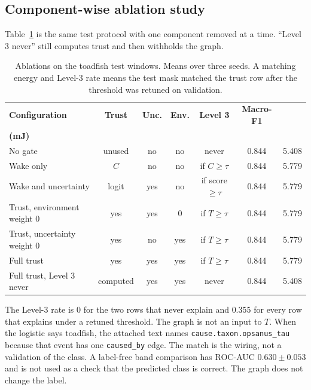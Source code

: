 \documentclass[sn-mathphys-num]{sn-jnl}%
\theoremstyle{thmstyleone}%
\theoremstyle{thmstyletwo}%
\theoremstyle{thmstylethree}%
\begin{document}
\subsection{Component-wise ablation study}\label{sec:ablation}

Table~\ref{tab:ablation} is the same test protocol with one component removed at a time. ``Level 3 never'' still computes trust and then withholds the graph.

\begin{table}[!htbp]
\centering
\caption{Ablations on the toadfish test windows. Means over three seeds. A matching energy and Level-3 rate means the test mask matched the trust row after the threshold was retuned on validation.}
\label{tab:ablation}
\footnotesize
\setlength{\tabcolsep}{3pt}
\begin{tabular}{|p{3.6cm}|c|c|c|c|c|c|}
\hline
\textbf{Configuration} & \textbf{Trust} & \textbf{Unc.} & \textbf{Env.} & \textbf{Level 3} & \textbf{Macro-F1} & \makecell{\textbf{Energy}\\\textbf{(mJ)}} \\
\hline
No gate & unused & no & no & never & 0.844 & 5.408 \\
\hline
Wake only & $C$ & no & no & if $C \ge \tau$ & 0.844 & 5.779 \\
\hline
Wake and uncertainty & logit & yes & no & if score $\ge \tau$ & 0.844 & 5.779 \\
\hline
Trust, environment weight 0 & yes & yes & 0 & if $T \ge \tau$ & 0.844 & 5.779 \\
\hline
Trust, uncertainty weight 0 & yes & no & yes & if $T \ge \tau$ & 0.844 & 5.779 \\
\hline
Full trust & yes & yes & yes & if $T \ge \tau$ & 0.844 & 5.779 \\
\hline
Full trust, Level 3 never & computed & yes & yes & never & 0.844 & 5.408 \\
\hline
\end{tabular}
\end{table}

The Level-3 rate is 0 for the two rows that never explain and $0.355$ for every row that explains under a retuned threshold. The graph is not an input to $T$. When the logistic says toadfish, the attached text names \texttt{cause.taxon.opsanus\_tau} because that event has one \texttt{caused\_by} edge. The match is the wiring, not a validation of the class. A label-free band comparison has ROC-AUC $0.630 \pm 0.053$ and is not used as a check that the predicted class is correct. The graph does not change the label.
\end{document}
